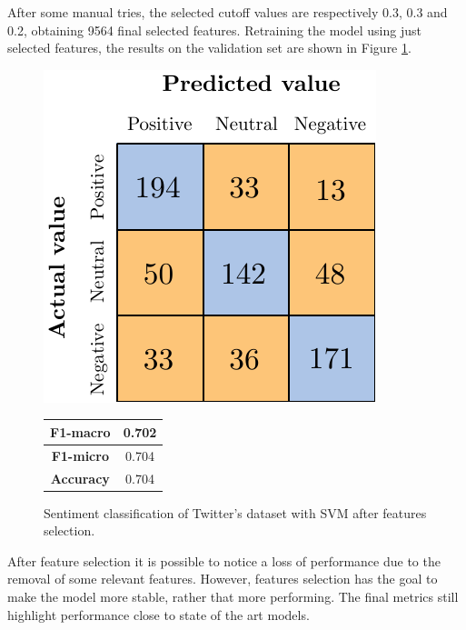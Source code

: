 
After some manual tries, the selected cutoff values are respectively 0.3, 0.3 and 0.2, obtaining 9564 final selected features. Retraining the model using just selected features, the results on the validation set are shown in Figure \ref{fig:tw_snt_svm_afs}.%


\begin{figure}[H]
	\begin{minipage}[b]{0.60\linewidth}
	\centering
	\includegraphics[scale=1]{figures/conf_matrices/twitter_snt_svm/twitter_snt_svm_afs.pdf}
	\end{minipage}
\begin{minipage}[b]{0.3\linewidth}
	\centering
	\begin{tabular}[b]{ | c | c | } 
		\hline
		\textbf{F1-macro} & 0.702 \\
		\hline
		\textbf{F1-micro} & 0.704 \\ 
		\hline
		\textbf{Accuracy} & 0.704 \\ 
		\hline
	\end{tabular}
\end{minipage}
	\caption{Sentiment classification of Twitter's dataset with SVM after features selection.}
	\label{fig:tw_snt_svm_afs}
\end{figure}



After feature selection it is possible to notice a loss of performance due to the removal of some relevant features. However, features selection has the goal to make the model more stable, rather that more performing. The final metrics still highlight performance close to state of the art models.


